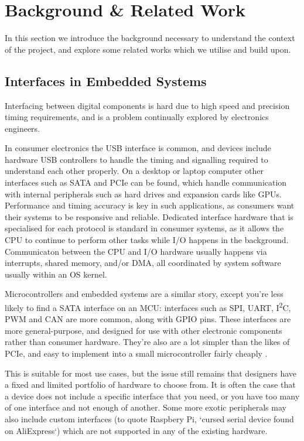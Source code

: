 \chapter{Background \& Related Work}
\label{ch:background}

In this section we introduce the background necessary to understand the context of the project, and explore some related works which we utilise and build upon.

\section{Interfaces in Embedded Systems}
\label{sec:embedded-interfaces}

Interfacing between digital components is hard due to high speed and precision timing requirements, and is a problem continually explored by electronics engineers.

In consumer electronics the USB interface is common, and devices include hardware USB controllers to handle the timing and signalling required to understand each other properly. On a desktop or laptop computer other interfaces such as SATA and PCIe can be found, which handle communication with internal peripherals such as hard drives and expansion cards like GPUs. Performance and timing accuracy is key in such applications, as consumers want their systems to be responsive and reliable. Dedicated interface hardware that is specialised for each protocol is standard in consumer systems, as it allows the CPU to continue to perform other tasks while I/O happens in the background. Communicaton between the CPU and I/O hardware usually happens via interrupts, shared memory, and/or DMA, all coordinated by system software usually within an OS kernel.

Microcontrollers and embedded systems are a similar story, except you're less likely to find a SATA interface on an MCU: interfaces such as SPI, UART, I\textsuperscript{2}C, PWM and CAN are more common, along with GPIO pins. These interfaces are more general-purpose, and designed for use with other electronic components rather than consumer hardware. They're also are a lot simpler than the likes of PCIe, and easy to implement into a small microcontroller fairly cheaply \cite{rp2040}.

This is suitable for most use cases, but the issue still remains that designers have a fixed and limited portfolio of hardware to choose from. It is often the case that a device does not include a specific interface that you need, or you have too many of one interface and not enough of another. Some more exotic peripherals may also include custom interfaces (to quote Raspbery Pi, `cursed serial device found on AliExpress`) which are not supported in any of the existing hardware.

